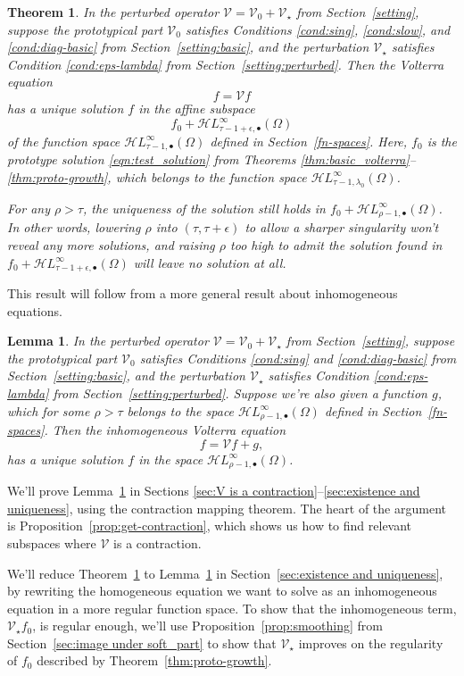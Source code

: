 \documentclass{article}
\theoremstyle{plain}
\newtheorem{lemma}{Lemma}
\newtheorem{thm}{Theorem}
\newcommand{\singexp}[2]{\mathcal{H}L^\infty_{#1, #2}}
\newcommand{\singexpalg}[1]{\singexp{#1}{\bullet}}
\newcommand{\volterra}{\mathcal{V}}
\newcommand{\hardpart}{\mathcal{V}_0}
\newcommand{\softpart}{\mathcal{V}_\star}
\begin{document}
\begin{thm}\label{thm:general_volterra}
In the perturbed operator $\volterra = \hardpart +\softpart$ from Section~\ref{setting}, suppose the prototypical part $\hardpart$ satisfies {\em Conditions \eqref{cond:sing}}, \eqref{cond:slow}, and \eqref{cond:diag-basic} from Section~\ref{setting:basic}, and the perturbation $\softpart$ satisfies Condition \eqref{cond:eps-lambda} from Section~\ref{setting:perturbed}. Then the Volterra equation
\[f = \volterra f\]
has a unique solution $f$ in the affine subspace
\[ f_0 + \singexpalg{\tau-1+\epsilon}(\Omega) \]
of the function space $\singexpalg{\tau-1}(\Omega)$ defined in Section~\ref{fn-spaces}. Here, $f_0$ is the prototype solution \eqref{eqn:test_solution} from Theorems \ref{thm:basic_volterra}--\ref{thm:proto-growth}, which belongs to the function space $\singexp{\tau-1}{\lambda_0}(\Omega)$.

For any $\rho > \tau$, the uniqueness of the solution still holds in $f_0 + \singexpalg{\rho-1}(\Omega)$. In other words, lowering $\rho$ into $(\tau, \tau+\epsilon)$ to allow a sharper singularity won't reveal any more solutions, and raising $\rho$ too high to admit the solution found in $f_0 + \singexpalg{\tau-1+\epsilon}(\Omega)$ will leave no solution at all.
\end{thm}
This result will follow from a more general result about inhomogeneous equations.
\begin{lemma}\label{lem:perturbed_volterra}
In the perturbed operator $\volterra = \hardpart +\softpart$ from Section~\ref{setting}, suppose the prototypical part $\hardpart$ satisfies {\em Conditions \eqref{cond:sing}} and \eqref{cond:diag-basic} from Section~\ref{setting:basic}, and the perturbation $\softpart$ satisfies {\em Condition \eqref{cond:eps-lambda}} from Section~\ref{setting:perturbed}. Suppose we're also given a function $g$, which for some $\rho > \tau$ belongs to the space $\singexpalg{\rho-1}(\Omega)$ defined in Section~\ref{fn-spaces}. Then the inhomogeneous Volterra equation
\[ f = \volterra f + g, \]
has a unique solution $f$ in the space $\singexpalg{\rho-1}(\Omega)$.
\end{lemma}
We'll prove Lemma~\ref{lem:perturbed_volterra} in Sections \ref{sec:V is a contraction}--\ref{sec:existence and uniqueness}, using the contraction mapping theorem. The heart of the argument is Proposition~\ref{prop:get-contraction}, which shows us how to find relevant subspaces where $\volterra$ is a contraction.

We'll reduce Theorem~\ref{thm:general_volterra} to Lemma~\ref{lem:perturbed_volterra} in Section~\ref{sec:existence and uniqueness}, by rewriting the homogeneous equation we want to solve as an inhomogeneous equation in a more regular function space. To show that the inhomogeneous term, $\softpart f_0$, is regular enough, we'll use Proposition~\ref{prop:smoothing} from Section~\ref{sec:image under soft_part} to show that $\softpart$ improves on the regularity of $f_0$ described by Theorem~\ref{thm:proto-growth}.
\end{document}
